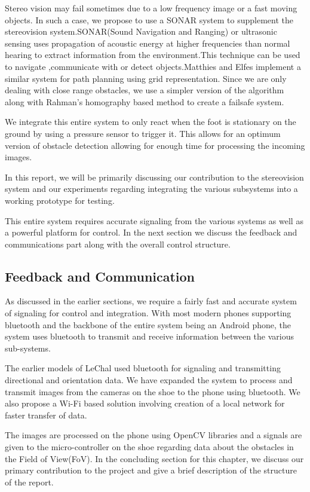\documentclass[11pt]{report}
\begin{document}
{Stereo vision may fail sometimes due to a low frequency image or a fast moving objects. In such a case, we propose to use a SONAR system to supplement the stereovision system.SONAR(Sound Navigation and Ranging) or ultrasonic sensing uses propagation of acoustic energy at higher frequencies than normal hearing to extract information from the environment.This technique can be used to navigate ,communicate with or detect objects.Matthies and Elfes\cite{sonarstereo} implement a similar system for path planning using grid representation. Since we are only dealing with close range obstacles, we use a simpler version of the algorithm along with Rahman's homography based method\cite{obstacleavoidance} to create a failsafe system. 

We integrate this entire system to only react when the foot is stationary on the ground by using a pressure sensor to trigger it. This allows for an optimum version of obstacle detection allowing for enough time for processing the incoming images.

In this report, we will be primarily discussing our contribution to the stereovision system and our experiments regarding integrating the various subsystems into a working prototype for testing.

This entire system requires accurate signaling from the various systems as well as a powerful platform for control. In the next section we discuss the feedback and communications part along with the overall control structure.

\subsection{Feedback and Communication}

As discussed in the earlier sections, we require a fairly fast and accurate system of signaling for control and integration. With most modern phones supporting bluetooth and the backbone of the entire system being an Android phone, the system uses bluetooth to transmit and receive information between the various sub-systems. 

The earlier models of LeChal used bluetooth for signaling and transmitting directional and orientation data\cite{compdata}. We have expanded the system to process and transmit images from the cameras on the shoe to the phone using bluetooth. We also propose a Wi-Fi based solution involving creation of a local network for faster transfer of data. 

The images are processed on the phone using OpenCV libraries and a signals are given to the micro-controller on the shoe regarding data about the obstacles in the Field of View(FoV).   
\newline
\newline
In the concluding section for this chapter, we discuss our primary contribution to the project and give a brief description of the structure of the report.

}
\end{document}
